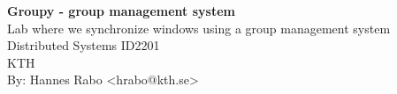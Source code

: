 \begin{titlepage}
	\thispagestyle{empty}
	
	\begin{center}
	  \vspace*{5cm}
	  
	  \huge{\textbf{Groupy - group management system}}\\
	  \vspace{.5cm}
	  \Large{Lab where we synchronize windows using a group management system}\\
	  \vspace{2.5cm}
	  \normalsize Distributed Systems ID2201\\
	  \vspace{2mm}		
	  \Large{KTH}\\
	  \vspace{6.5cm} 
	  \normalsize By: Hannes Rabo <hrabo@kth.se>
	\end{center} 
	
\end{titlepage}